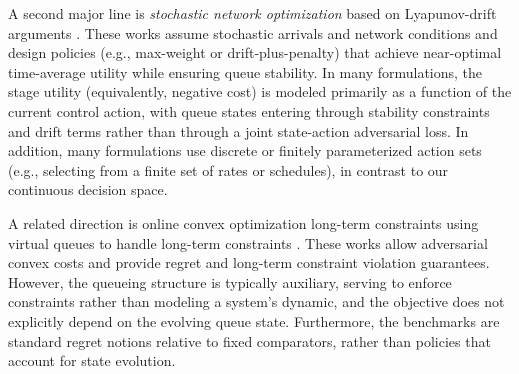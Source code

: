 \documentclass[11pt]{article}
\begin{document}
A second major line is \emph{stochastic network optimization} based on Lyapunov-drift arguments \cite{neely2010stochastic, georgiadis2006resource}. These works assume stochastic arrivals and network conditions and design policies (e.g., max-weight or drift-plus-penalty) that achieve near-optimal time-average utility while ensuring queue stability. In many formulations, the stage utility (equivalently, negative cost) is modeled primarily as a function of the current control action, with queue states entering through stability constraints and drift terms rather than through a joint state-action adversarial loss. In addition, many formulations use discrete or finitely parameterized action sets (e.g., selecting from a finite set of rates or schedules), in contrast to our continuous decision space.

A related direction is  online convex optimization long-term constraints using virtual queues to handle long-term constraints \cite{mahdavi2012trading, jenatton2016adaptive, yu2017online, JMLR:v21:16-494}. These works allow adversarial convex costs and provide regret and long-term constraint violation guarantees. However, the queueing structure is typically auxiliary, serving to enforce constraints rather than modeling a system's dynamic, and the objective does not explicitly depend on the evolving queue state. Furthermore, the benchmarks are standard regret notions relative to fixed comparators, rather than policies that account for state evolution.
\end{document}
